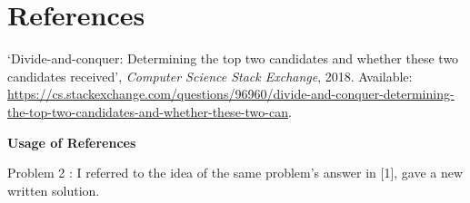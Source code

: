 \documentclass[10pt]{article}
\begin{document}
\section*{References}
\begin{enumerate}[leftmargin=*, label={[\arabic*]}]
    \item `Divide-and-conquer: Determining the top two candidates and whether these two candidates received', \textit{Computer Science Stack Exchange}, 2018. Available: \url{https://cs.stackexchange.com/questions/96960/divide-and-conquer-determining-the-top-two-candidates-and-whether-these-two-can}.
\end{enumerate}

\vspace{0.3cm}
\textbf{Usage of References}

\vspace{0.2cm}
Problem 2 : I referred to the idea of the same problem's answer in [1], gave a new written solution.
\end{document}
